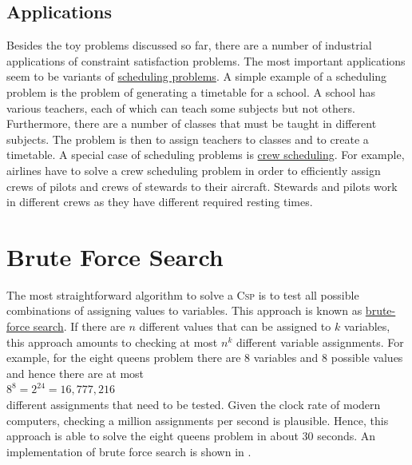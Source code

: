 \subsection{Applications}
Besides the toy problems discussed so far, there are a number of industrial applications of constraint
satisfaction problems.  The most important applications seem to be variants of
\href{https://en.wikipedia.org/wiki/Scheduling_(production_processes)}{scheduling problems}. 
A simple example of a scheduling problem is the problem of generating a timetable for a school.  A school has
various teachers, each of which can teach some subjects but not others.  Furthermore, there are a number of
classes that must be taught in different subjects.  The problem is then to assign teachers to classes and to
create a timetable.  A special case of scheduling problems is
\href{https://en.wikipedia.org/wiki/Crew_scheduling}{crew scheduling}.  For example, airlines have to solve a
crew scheduling problem in order to efficiently assign crews of pilots and crews of stewards to their
aircraft.  Stewards and pilots work in different crews as they have different required resting times.

\section{Brute Force Search}
The most straightforward algorithm to solve a \textsc{Csp} is to test all possible combinations of assigning
values to variables.  This approach is known as
\href{https://en.wikipedia.org/wiki/Brute-force_search}{brute-force search}.
If there are $n$ different values that can be assigned to $k$ variables, this approach amounts to 
checking at most $n^k$ different variable assignments.  For example, for the eight queens problem there are 8
variables and 8 possible values and hence there are at most
\\[0.2cm]
\hspace*{1.3cm}
$8^8 = 2^{24} = 16,777,216$
\\[0.2cm]
different assignments that need to be tested.  Given the clock rate of modern computers, checking a million
assignments per second is plausible.  Hence, this approach is able to solve the eight queens problem in
about 30 seconds.  An implementation of brute force search is shown in . 

